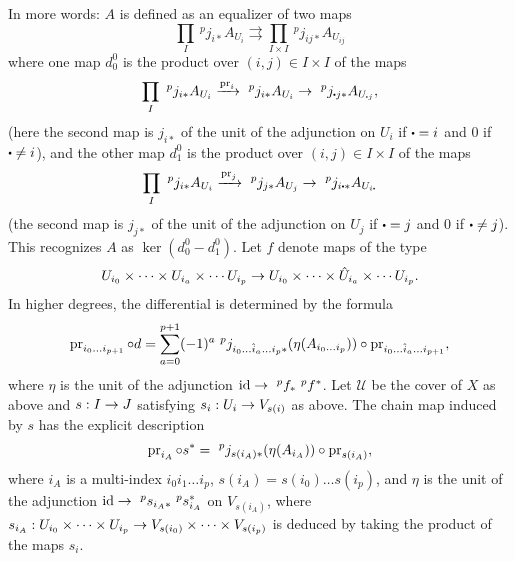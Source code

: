 \documentclass[deligne.tex]{subfiles}
\begin{document}
In more words: $A$ is defined as an equalizer of two maps
\begin{equation*}
	\prod_I\ ^pj_{i*}A_{U_i}\rightrightarrows\prod_{I\times I}\ ^pj_{ij*}A_{U_{ij}}
\end{equation*}
where one map $d^0_0$ is the product over $(i,j)\in I\times I$ of the maps
\begin{equation*}
	\prod_I\ ^pj_{i*}A_{U_i}\xra{\pr_i}\ ^pj_{i*}A_{U_i}\ra\ ^pj_{\dotp j*}A_{U_{\dotp j}},
\end{equation*}
(here the second map is $j_{i*}$ of the unit of the adjunction on $U_i$ if
$\dotp=i$ and 0 if $\dotp\ne i$),
and the other map $d^0_1$ is the product over $(i,j)\in I\times I$ of the maps
\begin{equation*}
	\prod_I\ ^pj_{i*}A_{U_i}\xra{\pr_j}\ ^pj_{j*}A_{U_j}\ra\ ^pj_{i\dotp*}A_{U_{i\dotp}}
\end{equation*}
(the second map is $j_{j*}$ of the unit of the adjunction on $U_j$ if
$\dotp=j$ and 0 if $\dotp\ne j$).
This recognizes $A$ as $\ker(d^0_0-d^0_1)$.
Let $f$ denote maps of the type
\begin{equation*}
	U_{i_0}\times\cdots\times U_{i_a}\times\cdots U_{i_p}
	\rightarrow U_{i_0}\times\cdots\times\hat U_{i_a}\times\cdots U_{i_p}.
\end{equation*}
In higher degrees, the differential is determined by the formula
\begin{equation*}
	\operatorname{pr}_{i_0\ldots i_{p+1}}\circ d
	=\sum_{a=0}^{p+1} (-1)^a\
	^pj_{i_0\ldots\hat i_a\ldots i_p*}(\eta(A_{i_0\ldots i_p}))
	\circ\operatorname{pr}_{i_0\ldots \hat i_a\ldots i_{p+1}},
\end{equation*}
where $\eta$ is the unit of the adjunction $\id\ra\ ^pf_*\ ^pf^*$.
Let $\mathcal U$ be the cover of $X$ as above and $s:I\rightarrow J$ satisfying
$s_i:U_i\rightarrow V_{s(i)}$ as above.
The chain map induced by $s$ has the explicit description
\begin{equation*}
	\operatorname{pr}_{i_A}\circ s^*=\ ^pj_{s(i_A)*}(\eta(A_{i_A}))\circ\operatorname{pr}_{s(i_A)},
\end{equation*}
where $i_A$ is a multi-index $i_0i_1\ldots i_p$, 
$s(i_A)=s(i_0)\ldots s(i_p)$, and $\eta$ is the unit of
the adjunction $\id\ra\ ^ps_{i_A*}\ ^ps_{i_A}^*$ on $V_{s(i_A)}$,
where
$s_{i_A}:U_{i_0}\times\cdots\times U_{i_p}\rightarrow V_{s(i_0)}\times\cdots\times
V_{s(i_p)}$ is deduced by taking the product of the maps $s_i.$
\end{document}
